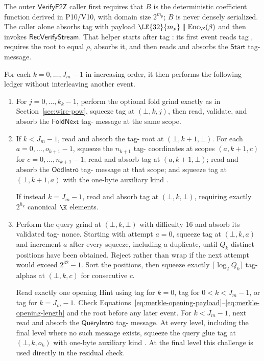 The outer $\mathsf{VerifyF2Z}$ caller first requires that $B$ is the
deterministic coefficient function derived in P10/V10, with domain size
$2^{m_p}$; $B$ is never densely serialized.  The caller alone absorbs tag
 with payload
$\LE{32}{m_p}\parallel\operatorname{Enc}_{\K}(\beta)$ and then invokes
$\mathsf{RecVerifyStream}$.  That helper starts after tag : its
first event reads tag , requires the root to equal $\rho$, absorbs
it, and then reads and absorbs the $\mathsf{Start}$ tag- message.

For each $k=0,\ldots,J_m-1$ in increasing order, it then performs the
following ledger without interleaving another event.
\begin{enumerate}
 \item For $j=0,\ldots,k_k-1$, perform the optional fold grind exactly as in
 Section~\ref{sec:wire-pow}, squeeze tag  at
 $(\bot,k,j)$, then read, validate, and absorb the $\mathsf{FoldNext}$
 tag- message at the same scope.

 \item If $k<J_m-1$, read and absorb the tag- root at
 $(\bot,k+1,\bot)$.  For each $a=0,\ldots,o_{k+1}-1$, squeeze the
 $n_{k+1}$ tag- coordinates at scopes $(a,k+1,c)$ for
 $c=0,\ldots,n_{k+1}-1$; read and absorb tag  at
 $(a,k+1,\bot)$; read and absorb the $\mathsf{OodIntro}$ tag-
 message at that scope; and squeeze tag  at
 $(\bot,k+1,a)$ with the one-byte auxiliary kind .

 If instead $k=J_m-1$, read and absorb tag  at
 $(\bot,k,\bot)$, requiring exactly $2^{h_k}$ canonical $\K$ elements.

 \item Perform the query grind at $(\bot,k,\bot)$ with difficulty 16 and
 absorb its validated tag- nonce.  Starting with attempt $a=0$,
 squeeze tag  at $(\bot,k,a)$ and increment $a$ after every
 squeeze, including a duplicate, until $Q_k$ distinct positions have been
 obtained.  Reject rather than wrap if the next attempt would exceed
 $2^{32}-1$.  Sort the positions, then squeeze exactly
 $\lceil\log_2Q_k\rceil$ tag- alphas at $(\bot,k,c)$ for
 consecutive $c$.

 Read exactly one opening Hint using tag  for $k=0$, tag
  for $0<k<J_m-1$, or tag  for $k=J_m-1$.  Check
 Equations~\eqref{eq:merkle-opening-payload}--\eqref{eq:merkle-opening-length}
 and the root before any later event.  For $k<J_m-1$, next read and absorb
 the $\mathsf{QueryIntro}$ tag- message.  At every level,
 including the final level where no such message exists, squeeze the query
 glue tag  at $(\bot,k,o_k)$ with one-byte auxiliary kind
 .  At the final level this challenge is used directly in the
 residual check.
\end{enumerate}

